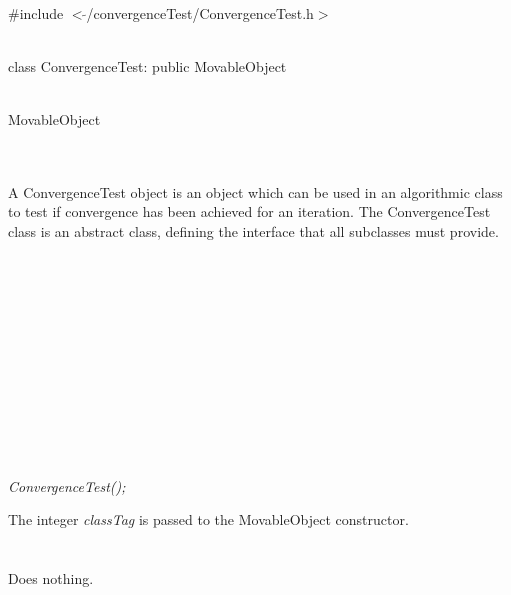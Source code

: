 
   \\
\#include $<\tilde{}$/convergenceTest/ConvergenceTest.h$>$  


  \\
class ConvergenceTest: public MovableObject  


 \\
MovableObject 

\indent{} \\

  \\
\indent A ConvergenceTest object is an object which can be used in an
algorithmic class to test if convergence has been achieved for an 
iteration. The ConvergenceTest class is an abstract class, defining
the interface that all subclasses must provide. \\

 \\
\indent{}  \\ 
\indent{}  \\ \\
\indent{}  \\ 
\indent{} \\ \\
\indent{}  \\ 
\indent{} \\
\indent{} \\
\indent{} \\

  \\
{\em ConvergenceTest();}  

The integer {\em classTag} is passed to the MovableObject constructor. \\

 \\
 \\ 
Does nothing. \\

